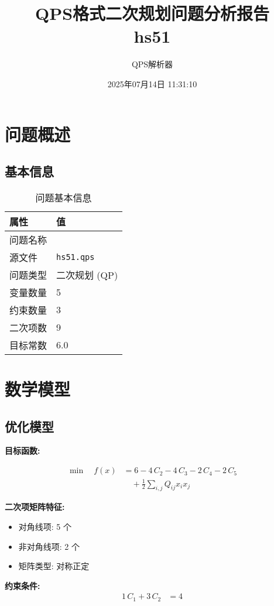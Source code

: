 \documentclass[a4paper,11pt]{article}
\title{QPS格式二次规划问题分析报告\\{\large hs51}}
\author{QPS解析器}
\date{2025年07月14日 11:31:10}
\begin{document}
\maketitle
\tableofcontents
\newpage

\section{问题概述}
\subsection{基本信息}
\begin{table}[h!]
\centering
\begin{tabular}{ll}
\toprule
\textbf{属性} & \textbf{值} \\
\midrule
问题名称 & \texttt{} \\
源文件 & \texttt{hs51.qps} \\
问题类型 & 二次规划 (QP) \\
变量数量 & 5 \\
约束数量 & 3 \\
二次项数 & 9 \\
目标常数 & 6.0 \\
\bottomrule
\end{tabular}
\caption{问题基本信息}
\end{table}

\section{数学模型}
\subsection{优化模型}

\textbf{目标函数:}

\begin{align}
\min\quad f(x) &= 6 - 4\,C_{2} - 4\,C_{3} - 2\,C_{4} - 2\,C_{5} \nonumber\\
&\quad + \frac{1}{2} \sum_{i,j} Q_{ij} x_i x_j\label{eq:objective}
\end{align}

\textbf{二次项矩阵特征:}
\begin{itemize}
\item 对角线项: 5 个
\item 非对角线项: 2 个
\item 矩阵类型: 对称正定
\end{itemize}

\textbf{约束条件:}
\begin{align}
1\,C_{1} + 3\,C_{2} &= 4 \nonumber
\end{align}
\end{document}
